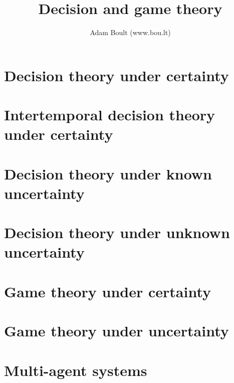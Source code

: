 \documentclass[oneside]{book}
\begin{document}
\author{Adam Boult (www.bou.lt)}
\title{Decision and game theory}
\maketitle

\setcounter{tocdepth}{0}
\tableofcontents



\part{Decision theory under certainty}




\part{Intertemporal decision theory under certainty}




\part{Decision theory under known uncertainty}



\part{Decision theory under unknown uncertainty}






\part{Game theory under certainty}






\part{Game theory under uncertainty}



\part{Multi-agent systems}
\end{document}
